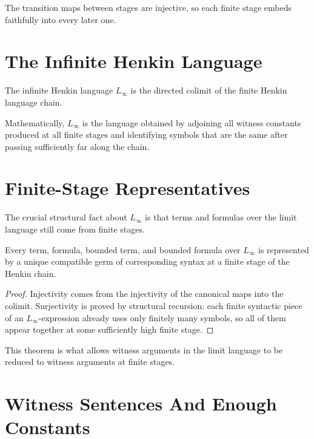 The transition maps between stages are injective, so each finite stage embeds
faithfully into every later one.

\section{The Infinite Henkin Language}

\begin{definition}
\label{def:linfty-language}
The infinite Henkin language $L_\infty$ is the directed colimit of the finite
Henkin language chain.
\end{definition}

Mathematically, $L_\infty$ is the language obtained by adjoining all witness
constants produced at all finite stages and identifying symbols that are the
same after passing sufficiently far along the chain.

\section{Finite-Stage Representatives}

The crucial structural fact about $L_\infty$ is that terms and formulas over
the limit language still come from finite stages.

\begin{theorem}
\label{thm:henkin-comparison-bijective}
Every term, formula, bounded term, and bounded formula over $L_\infty$ is
represented by a unique compatible germ of corresponding syntax at a finite
stage of the Henkin chain.
\end{theorem}

\begin{proof}
Injectivity comes from the injectivity of the canonical maps into the colimit.
Surjectivity is proved by structural recursion: each finite syntactic piece of
an $L_\infty$-expression already uses only finitely many symbols, so all of
them appear together at some sufficiently high finite stage.
\end{proof}

This theorem is what allows witness arguments in the limit language to be
reduced to witness arguments at finite stages.

\section{Witness Sentences And Enough Constants}

